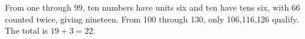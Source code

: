 From one through 99, ten numbers have units six and ten have tens six, with 66 counted twice, giving nineteen. From 100 through 130, only 106,116,126 qualify. The total is $19+3=\boxed{22}$.
